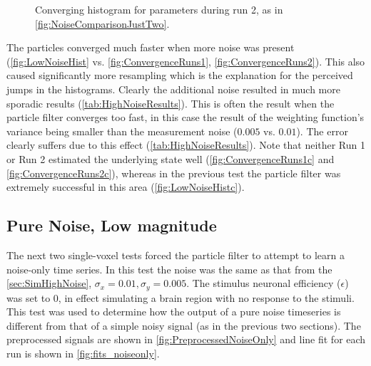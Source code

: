 \begin{figure}[H]
\caption{Converging histogram for parameters during run 2, as in \autoref{fig:NoiseComparisonJustTwo}.}
\label{fig:ConvergenceRuns2}
\end{figure}

The particles converged much faster when more noise was present (\autoref{fig:LowNoiseHist} vs. 
\autoref{fig:ConvergenceRuns1}, \autoref{fig:ConvergenceRuns2}). 
This also caused significantly more resampling which 
is the explanation for the perceived jumps in the histograms. 
Clearly the additional noise resulted in much more sporadic results (\autoref{tab:HighNoiseResults}). 
This is often the 
result when the particle filter converges too fast, in this case the result of the 
weighting function's variance being smaller than the measurement noise ($0.005$ vs. $0.01$). 
The error clearly suffers due to this effect (\autoref{tab:HighNoiseResults}).
Note that neither Run 1 or Run 2 estimated the underlying state well (\autoref{fig:ConvergenceRuns1c}
and \autoref{fig:ConvergenceRuns2c}), whereas
in the previous test the particle filter was extremely successful in this area (\autoref{fig:LowNoiseHistc}).

\subsection{Pure Noise, Low magnitude}
\label{sec:PureNoiseLowMag}
The next two single-voxel tests forced the particle filter to attempt to learn a noise-only
time series. In this test the noise was the same as that from the \autoref{sec:SimHighNoise},
$\sigma_x = 0.01, \sigma_y = 0.005$. The stimulus neuronal efficiency ($\epsilon$) was set 
to 0, in effect simulating a brain region with no response to the stimuli.
This test was used to determine how the output of a pure noise timeseries
is different from that of a simple noisy signal (as in the previous two sections). 
The preprocessed signals are shown in \autoref{fig:PreprocessedNoiseOnly}
and line fit for each run is shown in \autoref{fig:fits_noiseonly}. 

